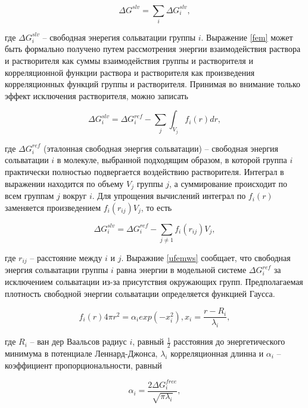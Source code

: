 \begin{equation}
	\Delta G^{slv} = \sum_i \Delta G_i^{slv},
	\label{fem}
\end{equation}

где $\Delta G_i^{slv}$ -- свободная энерегия сольватации группы $i$. Выражение \ref{fem} может быть формально получено путем рассмотрения энергии взаимодействия раствора и растворителя как суммы взаимодействия группы и растворителя и корреляционной функции раствора и растворителя как произведения корреляционных функций группы и растворителя. Принимая во внимание только эффект исключения растворителя, можно записать 

\begin{equation}
	\Delta G_i^{slv} = \Delta G_i^{ref} - \sum_j \int_{V_j} f_i(r) dr,
	\label{femws}
\end{equation}

где $\Delta G_i^{ref}$ (эталонная свободная энергия сольватации) -- свободная энергия сольватации $i$ в молекуле, выбранной подходящим образом, в которой группа $i$ практически полностью подвергается воздействию растворителя. Интеграл в выражении находится по объему $V_j$ группы $j$, а суммирование происходит по всем группам $j$ вокруг $i$. Для упрощения вычислений интеграл по $f_i(r)$ заменяется произведением $f_i(r_{ij})V_j$, то есть

\begin{equation}
	\Delta G_i^{slv} = \Delta G_i^{ref} - \sum_{j \neq 1} f_i(r_{ij}) V_j,
	\label{ufemws}
\end{equation}

где $r_{ij}$ -- расстояние между $i$ и $j$. Выражние \ref{ufemws} сообщает, что свободная энергия сольватации группы $i$ равна энергии в модельной системе $\Delta G_i^{ref}$ за исключением сольватации из-за присутствия окружающих групп. Предполагаемая плотность свободной энергии сольватации определяется функцией Гаусса.

\begin{equation}
	f_i(r) 4 \pi r^2 = \alpha_i exp(-x_i^2), x_i = \frac{r - R_i}{\lambda_i},
	\label{gf}
\end{equation}

где $R_i$ -- ван дер Ваальсов радиус $i$, равный $\frac{1}{2}$ расстояния до энергетического минимума в потенциале Леннард-Джонса, $\lambda_i$ корреляционная длинна и $\alpha_i$ -- коэффициент пропорциональности, равный

\begin{equation}
	\alpha_i = \frac{2 \Delta G_i^{free}}{\sqrt{\pi \lambda_i}},
	\label{kpr}
\end{equation}

